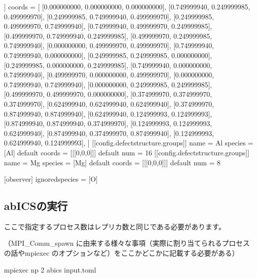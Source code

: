 \documentclass[letterpaper,10pt,dvipdfmx]{sphinxmanual}
\begin{document}
\begin{sphinxVerbatim}[commandchars=\\\{\}]
[[config.defect\PYGZus{}structure]]
coords = [
     [0.000000000, 0.000000000, 0.000000000],
     [0.749999940, 0.249999985, 0.499999970],
     [0.249999985, 0.749999940, 0.499999970],
     [0.249999985, 0.499999970, 0.749999940],
     [0.749999940, 0.499999970, 0.249999985],
     [0.499999970, 0.749999940, 0.249999985],
     [0.499999970, 0.249999985, 0.749999940],
     [0.000000000, 0.499999970, 0.499999970],
     [0.749999940, 0.749999940, 0.000000000],
     [0.249999985, 0.249999985, 0.000000000],
     [0.249999985, 0.000000000, 0.249999985],
     [0.749999940, 0.000000000, 0.749999940],
     [0.499999970, 0.000000000, 0.499999970],
     [0.000000000, 0.749999940, 0.749999940],
     [0.000000000, 0.249999985, 0.249999985],
     [0.499999970, 0.499999970, 0.000000000],
     [0.374999970, 0.374999970, 0.374999970],
     [0.624999940, 0.624999940, 0.624999940],
     [0.374999970, 0.874999940, 0.874999940],
     [0.624999940, 0.124999993, 0.124999993],
     [0.874999940, 0.874999940, 0.374999970],
     [0.124999993, 0.124999993, 0.624999940],
     [0.874999940, 0.374999970, 0.874999940],
     [0.124999993, 0.624999940, 0.124999993],
     ]
[[config.defect\PYGZus{}structure.groups]]
name = \PYGZsq{}Al\PYGZsq{}
\PYGZsh{} species = [\PYGZsq{}Al\PYGZsq{}]    \PYGZsh{} default
\PYGZsh{} coords = [[[0,0,0]]]  \PYGZsh{} default
num = 16
[[config.defect\PYGZus{}structure.groups]]
name = \PYGZsq{}Mg\PYGZsq{}
\PYGZsh{} species = [\PYGZsq{}Mg\PYGZsq{}]    \PYGZsh{} default
\PYGZsh{} coords = [[[0,0,0]]]  \PYGZsh{} default
num = 8


[observer]
ignored\PYGZus{}species = [\PYGZsq{}O\PYGZsq{}]
\end{sphinxVerbatim}


\subsection{abICSの実行}
\label{\detokenize{how_to_use/basic_usage:abics}}
ここで指定するプロセス数はレプリカ数と同じである必要があります。

（MPI\_Comm\_spawn に由来する様々な事項（実際に割り当てられるプロセスの話やmpiexec のオプションなど）をここかどこかに記載する必要がある）

\begin{sphinxVerbatim}[commandchars=\\\{\}]
\PYGZdl{} mpiexec \PYGZhy{}np 2 abics input.toml
\end{sphinxVerbatim}
\end{document}
